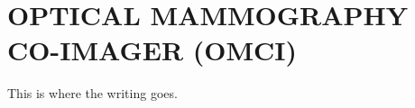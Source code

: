 
\chapter{OPTICAL MAMMOGRAPHY CO-IMAGER (OMCI)} %
\label{chap:omci}
This is where the writing goes. 


